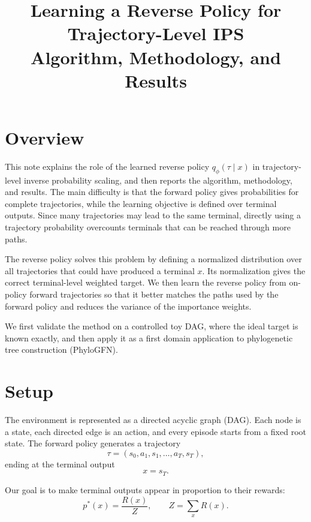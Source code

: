 \documentclass[11pt]{article}
\title{\textbf{Learning a Reverse Policy for Trajectory-Level IPS}\\
\large Algorithm, Methodology, and Results}
\author{}
\date{}
\newcommand{\qphi}{q_\phi}
\newcommand{\R}{R}
\begin{document}
\maketitle

\section*{Overview}

This note explains the role of the learned reverse policy \(\qphi(\tau\mid x)\) in trajectory-level inverse probability scaling, and then reports the algorithm, methodology, and results. The main difficulty is that the forward policy gives probabilities for complete trajectories, while the learning objective is defined over terminal outputs. Since many trajectories may lead to the same terminal, directly using a trajectory probability overcounts terminals that can be reached through more paths.

The reverse policy solves this problem by defining a normalized distribution over all trajectories that could have produced a terminal \(x\). Its normalization gives the correct terminal-level weighted target. We then learn the reverse policy from on-policy forward trajectories so that it better matches the paths used by the forward policy and reduces the variance of the importance weights.

We first validate the method on a controlled toy DAG, where the ideal target is known exactly, and then apply it as a first domain application to phylogenetic tree construction (PhyloGFN).

\section{Setup}
\label{sec:setup}

The environment is represented as a directed acyclic graph (DAG). Each node is a state, each directed edge is an action, and every episode starts from a fixed root state. The forward policy generates a trajectory
\begin{equation}
    \tau=(s_0,a_1,s_1,\ldots,a_T,s_T),
\end{equation}
ending at the terminal output
\begin{equation}
    x=s_T.
\end{equation}

Our goal is to make terminal outputs appear in proportion to their rewards:
\begin{equation}
    p^*(x)=\frac{\R(x)}{Z},
    \qquad
    Z=\sum_x \R(x).
    \label{eq:terminal-target}
\end{equation}
\end{document}
